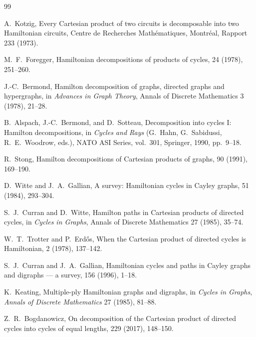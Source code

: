\documentclass[11pt]{article}
\begin{document}
\begin{thebibliography}{99}

A.~Kotzig,
\newblock Every Cartesian product of two circuits is decomposable into two Hamiltonian circuits,
\newblock Centre de Recherches Math\'ematiques, Montr\'eal, Rapport 233 (1973).

M.~F.~Foregger,
\newblock Hamiltonian decompositions of products of cycles,
 24 (1978), 251--260.

J.-C.~Bermond,
\newblock Hamilton decomposition of graphs, directed graphs and hypergraphs,
\newblock in {\em Advances in Graph Theory}, Annals of Discrete Mathematics 3 (1978), 21--28.

B.~Alspach, J.-C.~Bermond, and D.~Sotteau,
\newblock Decomposition into cycles I: Hamilton decompositions,
\newblock in {\em Cycles and Rays} (G.~Hahn, G.~Sabidussi, R.~E.~Woodrow, eds.),
NATO ASI Series, vol.~301, Springer, 1990, pp.~9--18.

R.~Stong,
\newblock Hamilton decompositions of Cartesian products of graphs,
 90 (1991), 169--190.

D.~Witte and J.~A.~Gallian,
\newblock A survey: Hamiltonian cycles in Cayley graphs,
 51 (1984), 293--304.

S.~J.~Curran and D.~Witte,
\newblock Hamilton paths in Cartesian products of directed cycles,
\newblock in {\em Cycles in Graphs}, Annals of Discrete Mathematics 27 (1985), 35--74.

W.~T.~Trotter and P.~Erd\H{o}s,
\newblock When the Cartesian product of directed cycles is Hamiltonian,
 2 (1978), 137--142.

S.~J.~Curran and J.~A.~Gallian,
\newblock Hamiltonian cycles and paths in Cayley graphs and digraphs --- a survey,
 156 (1996), 1--18.

K.~Keating,
\newblock Multiple-ply Hamiltonian graphs and digraphs,
\newblock in {\em Cycles in Graphs}, {\em Annals of Discrete Mathematics} 27 (1985), 81--88.

Z.~R.~Bogdanowicz,
\newblock On decomposition of the Cartesian product of directed cycles into cycles of equal lengths,
 229 (2017), 148--150.


\end{thebibliography}
\end{document}

